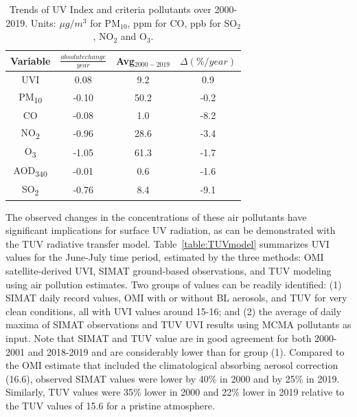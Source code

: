 \documentclass[journal=jacsat,manuscript=article]{achemso}
\begin{document}
\begin{table}[H]
  \centering
  \begin{tabular}{cccc} \hline
    Variable               & $\frac{absolute change}{year}$ & Avg$_{2000-2019}$ & $\Delta(\%/year)$ \\ \hline
    UVI                    & 0.08                           & 9.2               & 0.9               \\
    PM\textsubscript{10}   & -0.10                          & 50.2              & -0.2              \\
    CO                     & -0.08                          & 1.0               & -8.2              \\
    NO\textsubscript{2}    & -0.96                          & 28.6              & -3.4              \\
    O\textsubscript{3}     & -1.05                          & 61.3              & -1.7              \\
    AOD\textsubscript{340} & -0.01                          & 0.6               & -1.6              \\
    SO\textsubscript{2}    & -0.76                          & 8.4               & -9.1              \\
    \hline
  \end{tabular}
  \caption{{{{Trends of UV Index and criteria pollutants over 2000-2019.
                Units: $\mu g/m^3$ for PM$_{10}$, ppm for CO, ppb for SO$_2$, NO$_2$ and O$_3$.}}}}
  \label{table:uvindex}
\end{table}

The observed changes in the concentrations of these air pollutants have
significant implications for surface UV radiation, as can be
demonstrated with the TUV radiative transfer model.
Table~{\ref{table:TUVmodel}} summarizes UVI values for
the June-July time period, estimated by the three methods: OMI
satellite-derived UVI, SIMAT ground-based observations, and TUV modeling
using air pollution estimates. Two groups of values can be readily
identified: (1) SIMAT daily record values, OMI with or without BL
aerosols, and TUV for very clean conditions, all with UVI values around
15-16; and (2) the average of daily maxima of SIMAT observations and TUV UVI results using
MCMA pollutants as input. Note that SIMAT and TUV value are in good agreement
for both 2000-2001 and 2018-2019 and are considerably lower than for group (1). Compared to the OMI
estimate that included the climatological absorbing aerosol correction (16.6),
observed SIMAT values were lower by 40\% in 2000 and by 25\% in 2019.
Similarly, TUV values were 35\% lower in 2000 and 22\% lower in 2019
relative to the TUV values of 15.6 for a pristine atmosphere.
\end{document}
